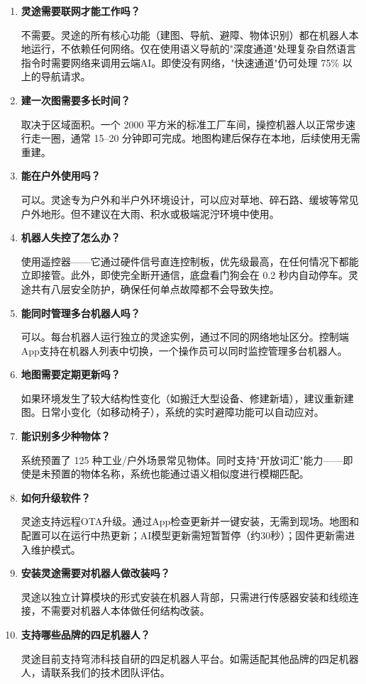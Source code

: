 \documentclass[a4paper, 12pt, openany]{book}
\begin{document}
\begin{enumerate}[leftmargin=2em, itemsep=14pt]

\item \textbf{灵途需要联网才能工作吗？}

不需要。灵途的所有核心功能（建图、导航、避障、物体识别）都在机器人本地运行，不依赖任何网络。仅在使用语义导航的"深度通道"处理复杂自然语言指令时需要网络来调用云端AI。即使没有网络，"快速通道"仍可处理 75\% 以上的导航请求。

\item \textbf{建一次图需要多长时间？}

取决于区域面积。一个 2000 平方米的标准工厂车间，操控机器人以正常步速行走一圈，通常 15--20 分钟即可完成。地图构建后保存在本地，后续使用无需重建。

\item \textbf{能在户外使用吗？}

可以。灵途专为户外和半户外环境设计，可以应对草地、碎石路、缓坡等常见户外地形。但不建议在大雨、积水或极端泥泞环境中使用。

\item \textbf{机器人失控了怎么办？}

使用遥控器——它通过硬件信号直连控制板，优先级最高，在任何情况下都能立即接管。此外，即使完全断开通信，底盘看门狗会在 0.2 秒内自动停车。灵途共有八层安全防护，确保任何单点故障都不会导致失控。

\item \textbf{能同时管理多台机器人吗？}

可以。每台机器人运行独立的灵途实例，通过不同的网络地址区分。控制端App支持在机器人列表中切换，一个操作员可以同时监控管理多台机器人。

\item \textbf{地图需要定期更新吗？}

如果环境发生了较大结构性变化（如搬迁大型设备、修建新墙），建议重新建图。日常小变化（如移动椅子），系统的实时避障功能可以自动应对。

\item \textbf{能识别多少种物体？}

系统预置了 125 种工业/户外场景常见物体。同时支持"开放词汇"能力——即使是未预置的物体名称，系统也能通过语义相似度进行模糊匹配。

\item \textbf{如何升级软件？}

灵途支持远程OTA升级。通过App检查更新并一键安装，无需到现场。地图和配置可以在运行中热更新；AI模型更新需短暂暂停（约30秒）；固件更新需进入维护模式。

\item \textbf{安装灵途需要对机器人做改装吗？}

灵途以独立计算模块的形式安装在机器人背部，只需进行传感器安装和线缆连接，不需要对机器人本体做任何结构改装。

\item \textbf{支持哪些品牌的四足机器人？}

灵途目前支持穹沛科技自研的四足机器人平台。如需适配其他品牌的四足机器人，请联系我们的技术团队评估。

\end{enumerate}
\end{document}
